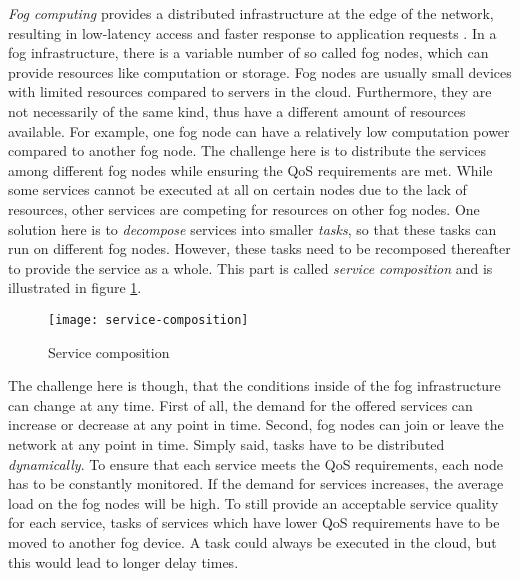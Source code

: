 \textit{Fog computing} provides a distributed infrastructure at the edge of the network, resulting in low-latency access and faster response to application requests \cite{mobility-aware-scheduling}.
In a fog infrastructure, there is a variable number of so called fog nodes, which can provide resources like computation or storage.
Fog nodes are usually small devices with limited resources compared to servers in the cloud.
Furthermore, they are not necessarily of the same kind, thus have a different amount of resources available.
For example, one fog node can have a relatively low computation power compared to another fog node.
The challenge here is to distribute the services among different fog nodes while ensuring the QoS requirements are met.
While some services cannot be executed at all on certain nodes due to the lack of resources, other services are competing for resources on other fog nodes.
One solution here is to \textit{decompose} services into smaller \textit{tasks}, so that these tasks can run on different fog nodes.
However, these tasks need to be recomposed thereafter to provide the service as a whole.
This part is called \textit{service composition} and is illustrated in figure \ref{fig:service-composition}.\\

\begin{figure}[htb]
    \centering
    \texttt{[image: service-composition]}
    \caption{Service composition}
    \label{fig:service-composition}
\end{figure}

The challenge here is though, that the conditions inside of the fog infrastructure can change at any time.
First of all, the demand for the offered services can increase or decrease at any point in time.
Second, fog nodes can join or leave the network at any point in time.
Simply said, tasks have to be distributed \textit{dynamically}.
To ensure that each service meets the QoS requirements, each node has to be constantly monitored.
If the demand for services increases, the average load on the fog nodes will be high.
To still provide an acceptable service quality for each service, tasks of services which have lower QoS requirements have to be moved to another fog device.
A task could always be executed in the cloud, but this would lead to longer delay times.
